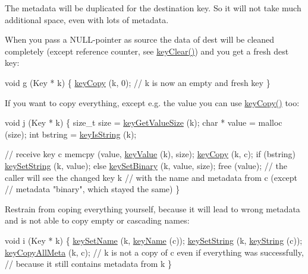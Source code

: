 The metadata will be duplicated for the destination key. So it will not take much additional space, even with lots of metadata.

When you pass a N\+U\+L\+L-\/pointer as source the data of dest will be cleaned completely (except reference counter, see \hyperlink{group__key_gab2242311a36bbc0520e0d36895107ec1}{key\+Clear()}) and you get a fresh dest key\+:


\begin{DoxyCodeInclude}
\textcolor{keywordtype}{void} g (Key * k)
\{
        \hyperlink{group__key_ga6a12cbbe656a1ad9f41b8c681d7a2f92}{keyCopy} (k, 0);
        \textcolor{comment}{// k is now an empty and fresh key}
\}
\end{DoxyCodeInclude}
 If you want to copy everything, except e.\+g. the value you can use \hyperlink{group__key_ga6a12cbbe656a1ad9f41b8c681d7a2f92}{key\+Copy()} too\+:


\begin{DoxyCodeInclude}
\textcolor{keywordtype}{void} j (Key * k)
\{
        \textcolor{keywordtype}{size\_t} size = \hyperlink{group__keyvalue_gae326672fffb7474abfe9baf53b73217e}{keyGetValueSize} (k);
        \textcolor{keywordtype}{char} * value = malloc (size);
        \textcolor{keywordtype}{int} bstring = \hyperlink{group__keytest_gaea7670778abd07fee0fe8ac12a149190}{keyIsString} (k);

        \textcolor{comment}{// receive key c}
        memcpy (value, \hyperlink{group__keyvalue_ga6f29609c5da53c6dc26a98678d5752af}{keyValue} (k), size);
        \hyperlink{group__key_ga6a12cbbe656a1ad9f41b8c681d7a2f92}{keyCopy} (k, c);
        \textcolor{keywordflow}{if} (bstring)
                \hyperlink{group__keyvalue_ga622bde1eb0e0c4994728331326340ef2}{keySetString} (k, value);
        \textcolor{keywordflow}{else}
                \hyperlink{group__keyvalue_gaa50a5358fd328d373a45f395fa1b99e7}{keySetBinary} (k, value, size);
        free (value);
        \textcolor{comment}{// the caller will see the changed key k}
        \textcolor{comment}{// with the name and metadata from c (except}
        \textcolor{comment}{// metadata "binary", which stayed the same)}
\}
\end{DoxyCodeInclude}
 Restrain from coping everything yourself, because it will lead to wrong metadata and is not able to copy empty or cascading names\+:


\begin{DoxyCodeInclude}
\textcolor{keywordtype}{void} i (Key * k)
\{
        \hyperlink{group__keyname_ga7699091610e7f3f43d2949514a4b35d9}{keySetName} (k, \hyperlink{group__keyname_ga8e805c726a60da921d3736cda7813513}{keyName} (c));
        \hyperlink{group__keyvalue_ga622bde1eb0e0c4994728331326340ef2}{keySetString} (k, \hyperlink{group__keyvalue_ga880936f2481d28e6e2acbe7486a21d05}{keyString} (c));
        \hyperlink{group__keymeta_ga8e63720a65610a29597494d0671f9401}{keyCopyAllMeta} (k, c);
        \textcolor{comment}{// k is not a copy of c even if everything was successfully,}
        \textcolor{comment}{// because it still contains metadata from k}
\}
\end{DoxyCodeInclude}



